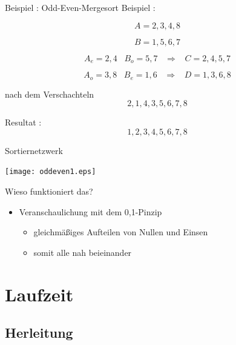 \documentclass[ucs,9pt]{beamer}
\begin{document}
\begin{frame}{Beispiel : Odd-Even-Mergesort}
Beispiel : \\
\begin{itemize}
\item[] $$ A = 2,3,4,8 $$
\item[] $$ B = 1,5,6,7 $$
 {\item[] $$ A_e = 2,4 \;\;\; B_o = 5,7 \;\;\; \Rightarrow \;\;\; C= 2,4,5,7 $$}
 {\item[] $$ A_o = 3,8 \;\;\; B_e = 1,6 \;\;\; \Rightarrow \;\;\; D = 1,3,6,8 $$}
 {\item[] nach dem Verschachteln $$ 2,1,4,3,5,6,7,8$$}
 {\item[] Resultat : $$1,2,3,4,5,6,7,8$$}
\end{itemize}
\end{frame}

\begin{frame}{Sortiernetzwerk}
\begin{center}
\texttt{[image: oddeven1.eps]}
\end{center}
\end{frame}

\begin{frame}{Wieso funktioniert das?}
\begin{itemize}
\item Veranschaulichung mit dem 0,1-Pinzip
	\begin{itemize}
		\item gleichmäßiges Aufteilen von Nullen und Einsen
		\item somit alle nah beieinander
	\end{itemize}

\end{itemize}
\end{frame}

\section{Laufzeit}
\subsection{Herleitung}
\end{document}
